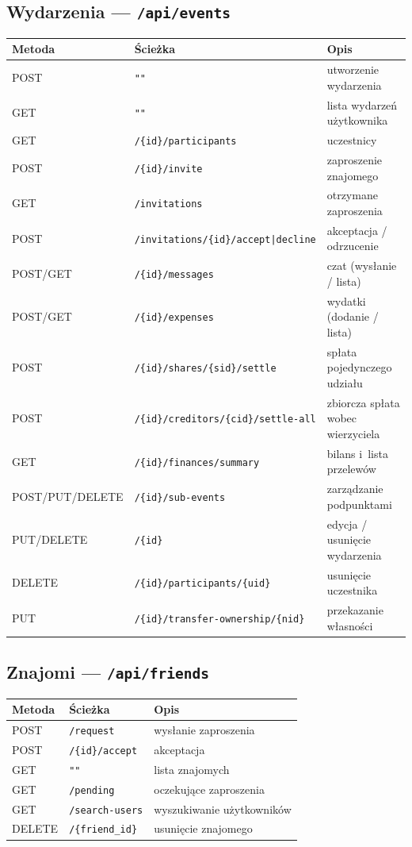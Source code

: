 \documentclass[11pt,a4paper]{article}
\begin{document}
\subsection{Wydarzenia --- \texttt{/api/events}}
\begin{longtable}{L{1.8cm} L{5.5cm} L{5.5cm}}
\toprule
\textbf{Metoda} & \textbf{Ścieżka} & \textbf{Opis} \\
\midrule
\endhead
POST & \texttt{""} & utworzenie wydarzenia \\
GET & \texttt{""} & lista wydarzeń użytkownika \\
GET & \texttt{/\{id\}/participants} & uczestnicy \\
POST & \texttt{/\{id\}/invite} & zaproszenie znajomego \\
GET & \texttt{/invitations} & otrzymane zaproszenia \\
POST & \texttt{/invitations/\{id\}/accept|decline} & akceptacja / odrzucenie \\
POST/GET & \texttt{/\{id\}/messages} & czat (wysłanie / lista) \\
POST/GET & \texttt{/\{id\}/expenses} & wydatki (dodanie / lista) \\
POST & \texttt{/\{id\}/shares/\{sid\}/settle} & spłata pojedynczego udziału \\
POST & \texttt{/\{id\}/creditors/\{cid\}/settle-all} & zbiorcza spłata wobec wierzyciela \\
GET & \texttt{/\{id\}/finances/summary} & bilans i~lista przelewów \\
POST/PUT/DELETE & \texttt{/\{id\}/sub-events} & zarządzanie podpunktami \\
PUT/DELETE & \texttt{/\{id\}} & edycja / usunięcie wydarzenia \\
DELETE & \texttt{/\{id\}/participants/\{uid\}} & usunięcie uczestnika \\
PUT & \texttt{/\{id\}/transfer-ownership/\{nid\}} & przekazanie własności \\
\bottomrule
\end{longtable}

\subsection{Znajomi --- \texttt{/api/friends}}
\begin{longtable}{L{1.8cm} L{5cm} L{6cm}}
\toprule
\textbf{Metoda} & \textbf{Ścieżka} & \textbf{Opis} \\
\midrule
\endhead
POST & \texttt{/request} & wysłanie zaproszenia \\
POST & \texttt{/\{id\}/accept} & akceptacja \\
GET & \texttt{""} & lista znajomych \\
GET & \texttt{/pending} & oczekujące zaproszenia \\
GET & \texttt{/search-users} & wyszukiwanie użytkowników \\
DELETE & \texttt{/\{friend\_id\}} & usunięcie znajomego \\
\bottomrule
\end{longtable}
\end{document}
